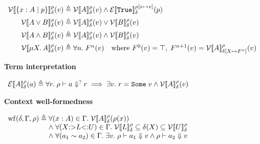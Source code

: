 \begin{figure}[p]
\begin{math}
\begin{array}{r@{\;}c@{\;}l}
  \\[0.5em]
  \mathcal{V}\llbracket \{x : A \mid p\} \rrbracket_{\delta}^{\rho}(v) &\triangleq& \mathcal{V}\llbracket A \rrbracket_{\delta}^{\rho}(v) \land \mathcal{E}\llbracket \texttt{True} \rrbracket_{\delta}^{\rho[x \mapsto v]}(p)
  \\[0.5em]
  \mathcal{V}\llbracket A \lor B \rrbracket_{\delta}^{\rho}(v) &\triangleq& \mathcal{V}\llbracket A \rrbracket_{\delta}^{\rho}(v) \lor \mathcal{V}\llbracket B \rrbracket_{\delta}^{\rho}(v)
  \\[0.5em]
  \mathcal{V}\llbracket A \land B \rrbracket_{\delta}^{\rho}(v) &\triangleq& \mathcal{V}\llbracket A \rrbracket_{\delta}^{\rho}(v) \land \mathcal{V}\llbracket B \rrbracket_{\delta}^{\rho}(v)
  \\[0.5em]
  \mathcal{V}\llbracket \mu X.\, A \rrbracket_{\delta}^{\rho}(v) &\triangleq& \forall n.\; F^n(v) \quad \text{where } F^0(v) = \top,\; F^{n+1}(v) = \mathcal{V}\llbracket A \rrbracket_{\delta[X \mapsto F^n]}^{\rho}(v)
\end{array}
\end{math}

\vspace{0.7em}
\noindent\textbf{Term interpretation} \hfill {}

\vspace{0.5em}
\begin{math}
\begin{array}{r@{\;}c@{\;}l}
  \mathcal{E}\llbracket A \rrbracket_{\delta}^{\rho}(a) &\triangleq& \forall r.\; \rho \vdash a \Downarrow^? r \implies \exists v.\; r = \texttt{Some}\; v \land \mathcal{V}\llbracket A \rrbracket_{\delta}^{\rho}(v)
\end{array}
\end{math}

\vspace{0.7em}
\noindent\textbf{Context well-formedness} \hfill {}

\vspace{0.5em}
\begin{math}
\begin{array}{r@{\;}c@{\;}l}
  \mathrm{wf}(\delta, \Gamma, \rho) &\triangleq& \forall (x : A) \in \Gamma.\; \mathcal{V}\llbracket A \rrbracket_{\delta}^{\rho}(\rho(x))
  \\
  && \land\; \forall (X {:>} L {<:} U) \in \Gamma.\; \mathcal{V}\llbracket L \rrbracket_{\delta}^{\rho} \subseteq \delta(X) \subseteq \mathcal{V}\llbracket U \rrbracket_{\delta}^{\rho}
  \\
  && \land\; \forall (a_1 \sim a_2) \in \Gamma.\; \exists v.\; \rho \vdash a_1 \Downarrow v \land \rho \vdash a_2 \Downarrow v
\end{array}
\end{math}


\end{figure}
